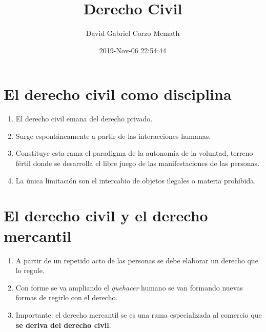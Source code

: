 \documentclass{article}
\title{Derecho Civil}
\author{David Gabriel Corzo Mcmath}
\date{2019-Nov-06 22:54:44}
\begin{document}
\maketitle

\section{El derecho civil como disciplina}
\begin{enumerate}
    \item El derecho civil emana del derecho privado.
    \item Surge espontáneamente a partir de las interacciones humanas.
    \item Constituye esta rama el paradigma de la autonomía de la voluntad, terreno fértil donde se desarrolla el libre juego de las manifestaciones de las personas.
    \item La única limitación son el intercabio de objetos ilegales o materia prohibida.
\end{enumerate}

\section{El derecho civil y el derecho mercantil}
\begin{enumerate}
    \item A partir de un repetido acto de las personas se debe elaborar un derecho que lo regule.
    \item Con forme se va ampliando el \emph{quehacer} humano se van formando nuevas formas de regirlo con el derecho.
    \item Importante: el derecho mercantil se es una rama especializada al comercio que \textbf{se deriva del derecho civil}.
\end{enumerate}

\end{document}
